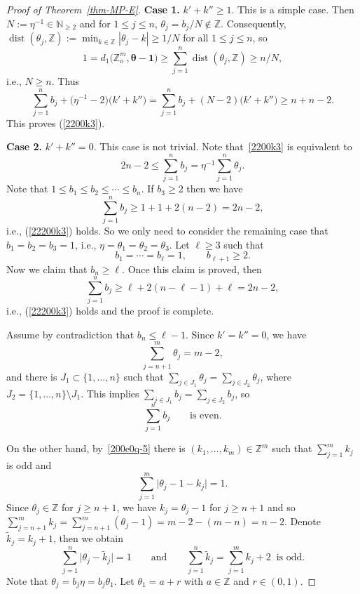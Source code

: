 \documentclass[10pt,a4paper]{amsart}
\numberwithin{equation}{section}
\def\Z{\mathbb Z}
\begin{document}
\begin{proof}[Proof of Theorem~\ref{thm-MP-E}]
{\bf Case 1.} $k'+k''\geq 1$. This is a simple case.
Then $N:=\eta^{-1}\in\mathbb{N}_{\geq 2}$ and for $1\leq j\leq n$, $\theta_j=b_j/N\notin\mathbb{Z}$. Consequently,
$\operatorname{dist}(\theta_j,\mathbb{Z}):=\min_{k\in\mathbb{Z}}|\theta_j-k|\geq 1/N$ for all $1\leq j\leq n$, so
\[1=d_1\bigl(\Z_o^{m},{\boldsymbol\theta-\boldsymbol 1}\bigr)\geq\sum_{j=1}^n\operatorname{dist}(\theta_j,\mathbb{Z})\geq n/N,\]
i.e., $N\geq n$. Thus
\[\sum_{j=1}^n b_j+\bigl(\eta^{-1}-2\bigr)\bigl(k'+k''\bigr)=\sum_{j=1}^n b_j+(N-2)\bigl(k'+k''\bigr)\geq n+n-2.\]
This proves (\ref{2200k3}).

{\bf Case 2.} $k'+k''=0$.
This case is not trivial.
Note that~\eqref{2200k3} is equivalent to
\begin{equation}\label{22200k3}2n-2\leq \sum_{j=1}^n b_j=\eta^{-1}\sum_{j=1}^n\theta_j.\end{equation}
Note that $1\leq b_1\leq b_2\leq\cdots\leq b_n$. If $b_3\geq 2$ then we have
\[\sum_{j=1}^n b_j\geq 1+1+2(n-2)=2n-2,\]
i.e., (\ref{22200k3}) holds. So we only need to consider the remaining case that $b_1=b_2=b_3=1$, i.e., $\eta=\theta_1=\theta_2=\theta_3$. Let $\ell\geq 3$ such that
\begin{equation}\label{bbbbb}b_1=\cdots=b_\ell=1,\qquad b_{\ell+1}\geq 2.\end{equation}
Now we claim that $b_n\geq \ell$. Once this claim is proved, then{\samepage
\[\sum_{j=1}^n b_j\geq \ell+2(n-\ell-1)+\ell=2n-2,\]
i.e., (\ref{22200k3}) holds and the proof is complete.}


Assume by contradiction that $b_n\leq \ell-1$.
Since $k'=k''=0$, we have
\[\sum_{j=n+1}^m \theta_{j}=m-2,\]
and there is $J_1\subset\{1,\dots,n\}$ such that $\sum_{j\in
 J_1}\theta_j=\sum_{j\in J_2}\theta_j$, where
$J_2=\{1,\dots,n\}\setminus J_1$. This implies $\sum_{j\in
 J_1}b_j=\sum_{j\in J_2}b_j$,
so
\begin{equation}\label{bbbeee}
\sum_{j=1}^n b_j \qquad \text{is even.}
\end{equation}

On the other hand, by~\eqref{200e0q-5} there is $(k_1,\dots,k_m)\in\mathbb{Z}^m$ such that $\sum_{j=1}^m k_j$ is odd and
\[\sum_{j=1}^m\bigl|\theta_j-1-k_j\bigr|=1.\]
Since $\theta_j\in\mathbb{Z}$ for $j\geq n+1$, we have $k_j=\theta_j-1$ for $j\geq n+1$ and so $\sum_{j=n+1}^m k_j=\sum_{j=n+1}^m (\theta_{j}-1)=m-2-(m-n)=n-2$. Denote $\tilde{k}_j=k_j+1$, then we obtain
\[\sum_{j=1}^n\big|\theta_j-\tilde{k}_j\big|=1\qquad \text{and}\qquad \sum_{j=1}^n \tilde{k}_j=\sum_{j=1}^m k_j+2\;\;\text{is odd}.\]
Note that $\theta_j=b_j\eta=b_j\theta_1$. Let $\theta_1=a+r$ with $a\in \mathbb{Z}$ and $r\in (0,1)$.


\end{proof}
\end{document}
